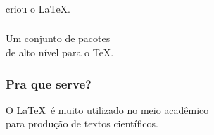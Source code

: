 \documentclass{beamer}
\begin{document}
{%

  \begin{frame}
    \begin{center}
      \vspace{.7\paperheight}
      \Huge \color{blue}{Leslie Lamport}
    \end{center}
  \end{frame}
}

\begin{frame}\frametitle{}
  \begin{center}
    \Huge criou o \LaTeX.
  \end{center}
\end{frame}

\begin{frame}\frametitle{}
  \begin{center}
    \Huge Um conjunto de pacotes \\ de alto nível para o \TeX.
  \end{center}
\end{frame}

\begin{frame}\frametitle{Pra que serve?}
  \begin{center}
    \Large O \LaTeX\ é muito utilizado no meio acadêmico \\ para produção de textos científicos.
  \end{center}
\end{frame}
\end{document}
